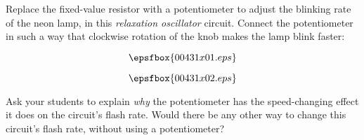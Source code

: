 

Replace the fixed-value resistor with a potentiometer to adjust the blinking rate of the neon lamp, in this {\it relaxation oscillator} circuit.  Connect the potentiometer in such a way that clockwise rotation of the knob makes the lamp blink faster:

$$\epsfbox{00431x01.eps}$$







$$\epsfbox{00431x02.eps}$$







Ask your students to explain {\it why} the potentiometer has the speed-changing effect it does on the circuit's flash rate.  Would there be any other way to change this circuit's flash rate, without using a potentiometer?




